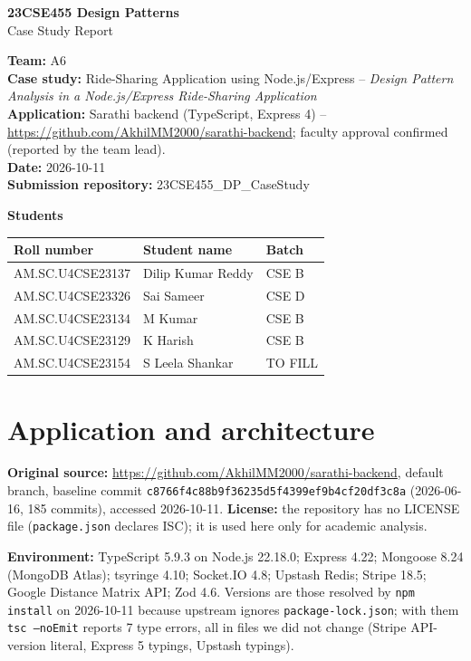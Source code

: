 \documentclass[11pt,a4paper]{article}
\begin{document}
\begin{center}
{\Large\bfseries 23CSE455 Design Patterns}\\[2pt]
{\large Case Study Report}
\end{center}

\textbf{Team:} A6\\
\textbf{Case study:} Ride-Sharing Application using Node.js/Express -- \emph{Design Pattern Analysis in a Node.js/Express Ride-Sharing Application}\\
\textbf{Application:} Sarathi backend (TypeScript, Express 4) -- \url{https://github.com/AkhilMM2000/sarathi-backend}; faculty approval confirmed (reported by the team lead).\\
\textbf{Date:} 2026-10-11\\
\textbf{Submission repository:} 23CSE455\_DP\_CaseStudy

\textbf{Students}\\
\begin{tabular}{@{}lll@{}}\toprule Roll number & Student name & Batch\\\midrule
AM.SC.U4CSE23137 & Dilip Kumar Reddy & CSE B \\
AM.SC.U4CSE23326 & Sai Sameer & CSE D \\
AM.SC.U4CSE23134 & M Kumar & CSE B \\
AM.SC.U4CSE23129 & K Harish & CSE B \\
AM.SC.U4CSE23154 & S Leela Shankar & TO FILL \\
\bottomrule\end{tabular}

\section{Application and architecture}
\textbf{Original source:} \url{https://github.com/AkhilMM2000/sarathi-backend}, default branch, baseline commit
\texttt{c8766f4c88b9f36235d5f4399ef9b4cf20df3c8a} (2026-06-16, 185 commits), accessed 2026-10-11.
\textbf{License:} the repository has no LICENSE file (\texttt{package.json} declares ISC); it is used here only for academic analysis.

\textbf{Environment:} TypeScript 5.9.3 on Node.js 22.18.0; Express 4.22; Mongoose 8.24 (MongoDB Atlas); tsyringe 4.10;
Socket.IO 4.8; Upstash Redis; Stripe 18.5; Google Distance Matrix API; Zod 4.6. Versions are those resolved by
\texttt{npm install} on 2026-10-11 because upstream ignores \texttt{package-lock.json}; with them \texttt{tsc --noEmit} reports 7
type errors, all in files we did not change (Stripe API-version literal, Express 5 typings, Upstash typings).
\end{document}
